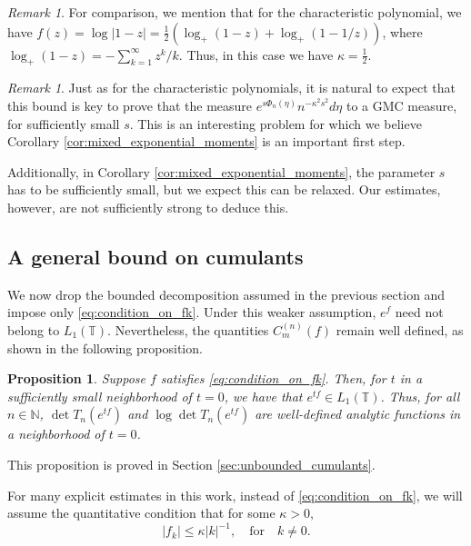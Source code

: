 \documentclass[11pt]{amsart}
\theoremstyle{plain}
\newtheorem{proposition}[theorem]{Proposition}
\theoremstyle{remark}
\newtheorem{remark}[theorem]{Remark}
\numberwithin{equation}{section}
\begin{document}
\begin{remark}
For comparison, we mention that for the characteristic polynomial, we have $f(z)=\log|1-z|=\frac{1}{2}\left(\log_+(1-z)+\log_+(1-1/z)\right)$, where $\log_+(1-z)=-\sum_{k=1}^{\infty} z^k/k$. Thus, in this case we have $\kappa=\frac12$. 
\end{remark}
\begin{remark}
    Just as for the characteristic polynomials, it is natural to expect that this bound is key to prove that the measure $e^{s \Phi_n(\eta)}n^{-\kappa^2 s^2} d\eta$ to a GMC measure, for sufficiently small $s$. This is an interesting problem for which we believe Corollary \ref{cor:mixed_exponential_moments} is an important first step. 

    Additionally, in Corollary \ref{cor:mixed_exponential_moments}, the parameter $s$ has to be sufficiently small, but we expect this can be relaxed.  Our estimates, however, are not sufficiently strong to deduce this. 
\end{remark}





\subsection{A general bound on cumulants}\label{sec:general_bounds}
We now drop the bounded decomposition assumed in the previous section and impose only \eqref{eq:condition_on_fk}. Under this weaker assumption, \(e^f\) need not belong to \(L_1(\mathbb T)\). Nevertheless, the quantities \(C_m^{(n)}(f)\) remain well defined, as shown in the following proposition.

\begin{proposition}\label{prop:analyticity_unbounded_repeated}
Suppose $f$ satisfies \eqref{eq:condition_on_fk}. Then, for $t$ in a sufficiently small neighborhood of $t=0$, we have that  $e^{tf} \in L_1(\mathbb T)$. Thus, for all $n\in\mathbb{N}$, $\det T_n(e^{tf})$ and $\log\det T_n(e^{tf})$ are well-defined analytic functions in a neighborhood of $t=0$. 
\end{proposition}
This proposition is proved in Section \ref{sec:unbounded_cumulants}. 

For many explicit estimates in this work, instead of \eqref{eq:condition_on_fk}, we will assume the quantitative condition that for some $\kappa>0$, 
\begin{equation}\label{eq:condition_on_fk2}
|f_k|\leq \kappa |k|^{-1}, \quad\text{for}\quad k\not=0.
\end{equation}
\end{document}
